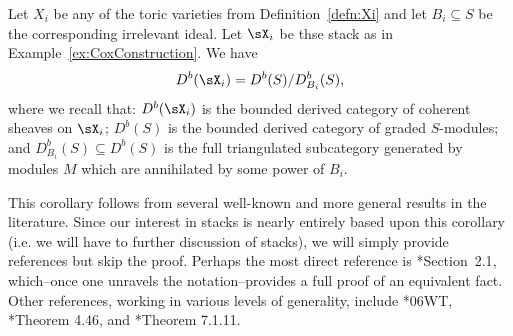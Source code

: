 \begin{cor}\label{cor:stacksAndDb}
  Let $X_i$ be any of the toric varieties from Definition~\ref{defn:Xi} and let $B_i\subseteq S$ be the corresponding irrelevant ideal.  Let $\sX_i$ be thse stack as in Example~\ref{ex:CoxConstruction}.  We have
  \[
  D^b(\sX_i) = D^b(S) / D^b_{B_i}(S),
  \]
  where we recall that: $D^b(\sX_i)$ is the bounded derived category of coherent sheaves on $\sX_i$; $D^b(S)$ is the bounded derived category of graded $S$-modules; and $D^b_{B_i}(S)\subseteq D^b(S)$ is the full triangulated subcategory generated by modules $M$ which are annihilated by some power of $B_i$.
\end{cor}
This corollary follows from several well-known and more general results in the literature.  Since our interest in stacks is nearly entirely based upon this corollary (i.e. we will have to further discussion of stacks), we will simply provide references but skip the proof.  Perhaps the most direct reference is \cite{AOV08}*{Section~2.1}, which--once one unravels the notation--provides a full proof of an equivalent fact.  Other references, working in various levels of generality, include  \cite{stacks}*{06WT}, \cite{Vistoli05}*{Theorem 4.46}, and  \cite{Alper13}*{Theorem 7.1.11}. 
